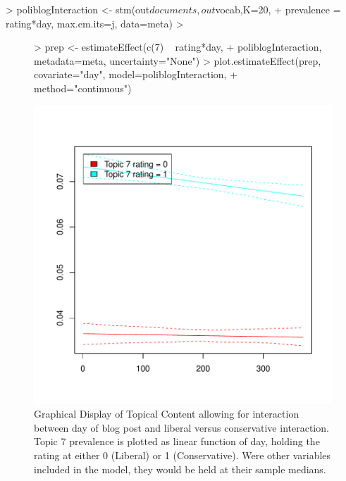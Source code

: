 \documentclass[nojss]{jss}
\begin{document}
\begin{Schunk}
\begin{Sinput}
> poliblogInteraction <- stm(out$documents,out$vocab,K=20,
+     prevalence =~ rating*day, max.em.its=j, data=meta)
> 
\end{Sinput}
\end{Schunk}


\begin{figure}[t!]
\begin{center}
\begin{Schunk}
\begin{Sinput}
> prep <- estimateEffect(c(7) ~ rating*day,
+         poliblogInteraction, metadata=meta, uncertainty="None")
> plot.estimateEffect(prep, covariate="day", model=poliblogInteraction,
+                  method="continuous")
\end{Sinput}
\end{Schunk}
\includegraphics{stmVignette-022}
\caption{Graphical Display of Topical Content allowing for interaction between day of blog post and liberal versus conservative interaction. Topic 7 prevalence is plotted as linear function of day, holding the rating at either 0 (Liberal) or 1 (Conservative). Were other variables included in the model, they would be held at their sample medians.}
\label{fig:spline2}
\end{center}
\end{figure}
\end{document}
